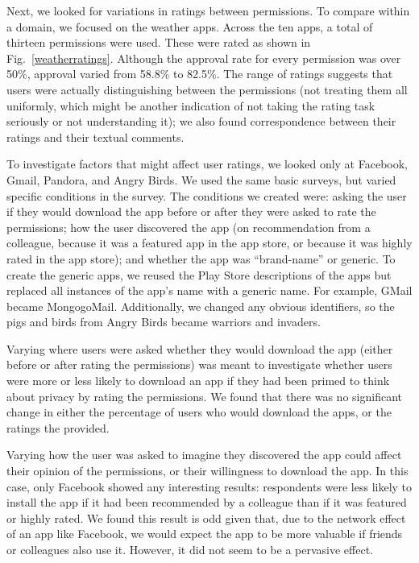 \documentclass[11pt]{article}
\begin{document}
Next, we looked for variations in ratings between permissions. To
compare within a domain, we focused on the weather apps. Across the
ten apps, a total of thirteen permissions were used. These were rated
as shown in Fig.~\ref{weatherratings}.  Although the approval rate for
every permission was over 50\%, approval varied from 58.8\% to
82.5\%. The range of ratings suggests that users were actually
distinguishing between the permissions (not treating them all
uniformly, which might be another indication of not taking the rating
task seriously or not understanding it); we also found correspondence
between their ratings and their textual comments.

To investigate factors that might affect user ratings, we looked only at Facebook, Gmail,
Pandora, and Angry Birds.  We used the same basic surveys, but
varied specific conditions in the survey. The conditions we created
were: asking the user if they would download the app before or after
they were asked to rate the permissions; how the user discovered the
app (on recommendation from a colleague, because it was a featured app in
the app store, or because it was highly rated in the app store); and
whether the app was ``brand-name'' or generic. To create the generic
apps, we reused the Play Store descriptions of the apps but replaced all
instances of the app's name with a generic name. For example, GMail
became MongogoMail.  Additionally, we changed any obvious identifiers,
so the pigs and birds from Angry Birds became warriors and invaders.

Varying where users were asked whether they would download the app 
(either before or after rating the permissions) was
meant to investigate whether users were more or less likely to
download an app if they had been primed to think about privacy by
rating the permissions. We found that there was no significant change
in either the percentage of users who would download the apps, or the
ratings the provided.

Varying how the user was asked to imagine they discovered the app
could affect their opinion of the permissions, or their willingness to
download the app. In this case, only Facebook showed any interesting
results: respondents were less likely to install the app if it
had been recommended by a colleague than if it was featured or highly
rated. We found this result is odd given that, due to the network
effect of an app like Facebook, we would expect the app to be more
valuable if friends or colleagues also use it. However, it did not
seem to be a pervasive effect.
\end{document}
